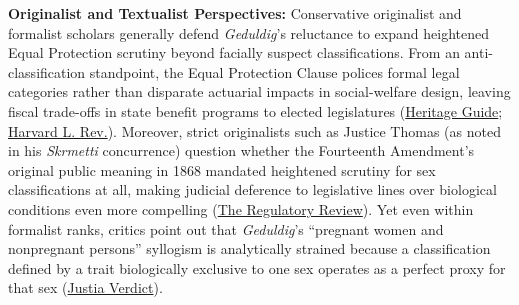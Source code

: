 \documentclass[12pt]{article}
\begin{document}
\textbf{Originalist and Textualist Perspectives:} Conservative originalist and formalist scholars generally defend \textit{Geduldig}'s reluctance to expand heightened Equal Protection scrutiny beyond facially suspect classifications. From an anti-classification standpoint, the Equal Protection Clause polices formal legal categories rather than disparate actuarial impacts in social-welfare design, leaving fiscal trade-offs in state benefit programs to elected legislatures (\href{https://constitution.heritage.org/essays/amdt-14-s1-e/}{Heritage Guide}; \href{https://harvardlawreview.org/print/vol-138/making-equal-protection-protect/}{Harvard L. Rev.}). Moreover, strict originalists such as Justice Thomas (as noted in his \textit{Skrmetti} concurrence) question whether the Fourteenth Amendment's original public meaning in 1868 mandated heightened scrutiny for sex classifications at all, making judicial deference to legislative lines over biological conditions even more compelling (\href{https://www.theregreview.org/2025/08/04/mayeri-shanor-trans-rights-and-the-future-of-sex-discrimination-law/}{The Regulatory Review}). Yet even within formalist ranks, critics point out that \textit{Geduldig}'s ``pregnant women and nonpregnant persons'' syllogism is analytically strained because a classification defined by a trait biologically exclusive to one sex operates as a perfect proxy for that sex (\href{https://verdict.justia.com/2019/10/22/the-pregnant-pause-placing-elizabeth-warrens-experience-of-pregnancy-discrimination-in-historical-context}{Justia Verdict}).
\end{document}
